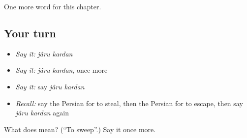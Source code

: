 \begin{grammarlens}[title={What you've built}]
One more word for this chapter.
\end{grammarlens}

\subsection*{Your turn}
\begin{itemize}
\raggedright
  \item \emph{Say it:} \emph{jâru kardan}
  \item \emph{Say it:} \emph{jâru kardan}, once more
  \item \emph{Say it:} say \emph{jâru kardan}
  \item \emph{Recall:} say the Persian for to steal, then the Persian for to escape, then say \emph{jâru kardan} again
\end{itemize}

\begin{tcolorbox}[breakable,colback=teal!4,colframe=teal!35!black,title={Before you move on}]
What does   mean? (\textquotedblleft{}To sweep\textquotedblright{}.) Say it once more.
\end{tcolorbox}
